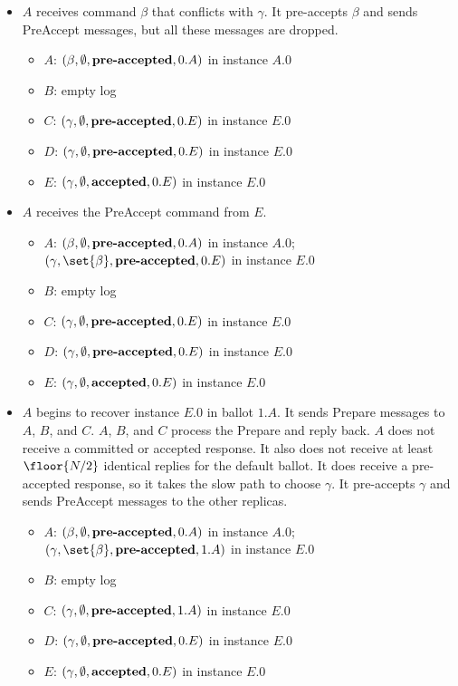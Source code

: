 \documentclass{mwhittaker}
\begin{document}
\begin{itemize}
  \item
    $A$ receives command $\beta$ that conflicts with $\gamma$. It pre-accepts
    $\beta$ and sends PreAccept messages, but all these messages are dropped.
    \begin{itemize}
      \item $A$: $(\beta, \emptyset{}, \textbf{pre-accepted}{}, 0.A)$ in instance $A.0$
      \item $B$: empty \cmd{} log
      \item $C$: $(\gamma, \emptyset{}, \textbf{pre-accepted}{}, 0.E)$ in instance $E.0$
      \item $D$: $(\gamma, \emptyset{}, \textbf{pre-accepted}{}, 0.E)$ in instance $E.0$
      \item $E$: $(\gamma, \emptyset{}, \textbf{accepted}{}, 0.E)$ in instance $E.0$
    \end{itemize}

  \item
    $A$ receives the PreAccept command from $E$.
    \begin{itemize}
      \item $A$: $(\beta, \emptyset{}, \textbf{pre-accepted}{}, 0.A)$ in instance $A.0$;
                 $(\gamma, \set{\beta}, \preaccepted{}, 0.E)$ in instance $E.0$
      \item $B$: empty \cmd{} log
      \item $C$: $(\gamma, \emptyset{}, \textbf{pre-accepted}{}, 0.E)$ in instance $E.0$
      \item $D$: $(\gamma, \emptyset{}, \textbf{pre-accepted}{}, 0.E)$ in instance $E.0$
      \item $E$: $(\gamma, \emptyset{}, \textbf{accepted}{}, 0.E)$ in instance $E.0$
    \end{itemize}

  \item
    $A$ begins to recover instance $E.0$ in ballot $1.A$. It sends Prepare
    messages to $A$, $B$, and $C$. $A$, $B$, and $C$ process the Prepare and
    reply back. $A$ does not receive a committed or accepted response. It also
    does not receive at least $\floor{N/2}$ identical replies for the default
    ballot. It does receive a pre-accepted response, so it takes the slow path
    to choose $\gamma$. It pre-accepts $\gamma$ and sends PreAccept messages to
    the other replicas.
    \begin{itemize}
      \item $A$: $(\beta, \emptyset{}, \textbf{pre-accepted}{}, 0.A)$ in instance $A.0$;
                 $(\gamma, \set{\beta}, \preaccepted{}, 1.A)$ in instance $E.0$
      \item $B$: empty \cmd{} log
      \item $C$: $(\gamma, \emptyset{}, \textbf{pre-accepted}{}, 1.A)$ in instance $E.0$
      \item $D$: $(\gamma, \emptyset{}, \textbf{pre-accepted}{}, 0.E)$ in instance $E.0$
      \item $E$: $(\gamma, \emptyset{}, \textbf{accepted}{}, 0.E)$ in instance $E.0$
    \end{itemize}


\end{itemize}
\end{document}

